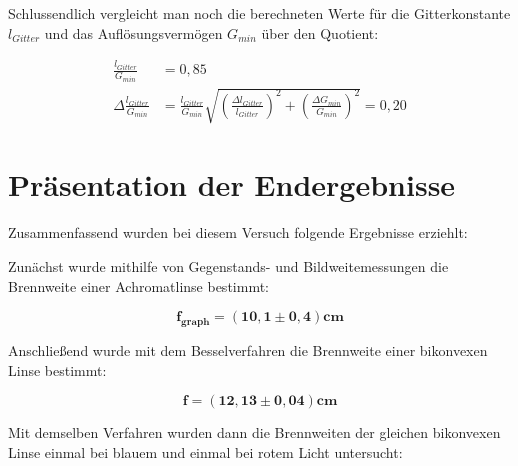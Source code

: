 \documentclass{article}
\begin{document}

Schlussendlich vergleicht man noch die berechneten Werte für die Gitterkonstante $l_{Gitter}$ und das Auflösungsvermögen $G_{min}$ über den Quotient:

\begin{equation}
    \begin{split}
        \frac{l_{Gitter}}{G_{min}} &= 0,85 \\
        \Delta \frac{l_{Gitter}}{G_{min}} &= \frac{l_{Gitter}}{G_{min}} \sqrt{\left( \frac{\Delta l_{Gitter}}{l_{Gitter}} \right)^2 + \left( \frac{\Delta G_{min}}{G_{min}} \right)^2} = 0,20
    \end{split}
\end{equation}


\newpage

\section{Präsentation der Endergebnisse}

Zusammenfassend wurden bei diesem Versuch folgende Ergebnisse erziehlt:

Zunächst wurde mithilfe von Gegenstands- und Bildweitemessungen die Brennweite einer Achromatlinse bestimmt:

\begin{equation}
    \bm{f_{graph} = (10,1 \pm 0,4)cm}
\end{equation}

Anschließend wurde mit dem Besselverfahren die Brennweite einer bikonvexen Linse bestimmt:

\begin{equation}
    \bm{f} = \bm{(12,13 \pm 0,04)cm}
\end{equation}

Mit demselben Verfahren wurden dann die Brennweiten der gleichen bikonvexen Linse einmal bei blauem und einmal bei rotem Licht untersucht:
\end{document}
